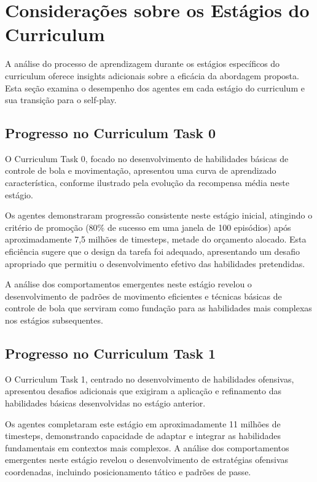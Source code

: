 \section{Considerações sobre os Estágios do Curriculum}
\label{sec:analise_estagios}

A análise do processo de aprendizagem durante os estágios específicos do curriculum oferece insights adicionais sobre a eficácia da abordagem proposta. Esta seção examina o desempenho dos agentes em cada estágio do curriculum e sua transição para o self-play.

\subsection{Progresso no Curriculum Task 0}

O Curriculum Task 0, focado no desenvolvimento de habilidades básicas de controle de bola e movimentação, apresentou uma curva de aprendizado característica, conforme ilustrado pela evolução da recompensa média neste estágio.

Os agentes demonstraram progressão consistente neste estágio inicial, atingindo o critério de promoção (80\% de sucesso em uma janela de 100 episódios) após aproximadamente 7,5 milhões de timesteps, metade do orçamento alocado. Esta eficiência sugere que o design da tarefa foi adequado, apresentando um desafio apropriado que permitiu o desenvolvimento efetivo das habilidades pretendidas.

A análise dos comportamentos emergentes neste estágio revelou o desenvolvimento de padrões de movimento eficientes e técnicas básicas de controle de bola que serviram como fundação para as habilidades mais complexas nos estágios subsequentes.

\subsection{Progresso no Curriculum Task 1}

O Curriculum Task 1, centrado no desenvolvimento de habilidades ofensivas, apresentou desafios adicionais que exigiram a aplicação e refinamento das habilidades básicas desenvolvidas no estágio anterior.

Os agentes completaram este estágio em aproximadamente 11 milhões de timesteps, demonstrando capacidade de adaptar e integrar as habilidades fundamentais em contextos mais complexos. A análise dos comportamentos emergentes neste estágio revelou o desenvolvimento de estratégias ofensivas coordenadas, incluindo posicionamento tático e padrões de passe.

